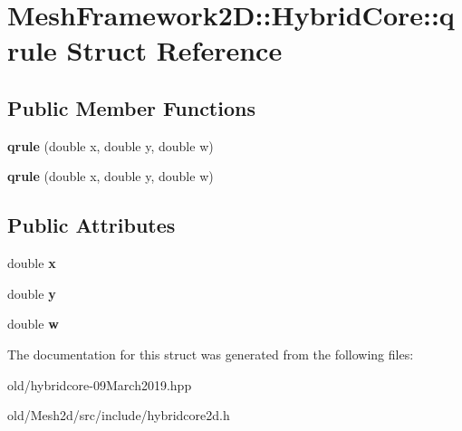 \hypertarget{structMeshFramework2D_1_1HybridCore_1_1qrule}{}\section{Mesh\+Framework2D\+:\+:Hybrid\+Core\+:\+:qrule Struct Reference}
\label{structMeshFramework2D_1_1HybridCore_1_1qrule}
\subsection*{Public Member Functions}
\begin{DoxyCompactItemize}
\item 
\mbox{\label{structMeshFramework2D_1_1HybridCore_1_1qrule_a106ae79b1d4107f9e81076e4e16da785}} 
{\bfseries qrule} (double x, double y, double w)
\item 
\mbox{\label{structMeshFramework2D_1_1HybridCore_1_1qrule_a106ae79b1d4107f9e81076e4e16da785}} 
{\bfseries qrule} (double x, double y, double w)
\end{DoxyCompactItemize}
\subsection*{Public Attributes}
\begin{DoxyCompactItemize}
\item 
\mbox{\label{structMeshFramework2D_1_1HybridCore_1_1qrule_a186ce7014f70554bb5396a870edae915}} 
double {\bfseries x}
\item 
\mbox{\label{structMeshFramework2D_1_1HybridCore_1_1qrule_a956cd687f095e51aca2ee9a35509b5cf}} 
double {\bfseries y}
\item 
\mbox{\label{structMeshFramework2D_1_1HybridCore_1_1qrule_a12fb43e6d632f11f4cdd27068aec1411}} 
double {\bfseries w}
\end{DoxyCompactItemize}


The documentation for this struct was generated from the following files\+:\begin{DoxyCompactItemize}
\item 
old/hybridcore-\/09\+March2019.\+hpp\item 
old/\+Mesh2d/src/include/hybridcore2d.\+h\end{DoxyCompactItemize}
